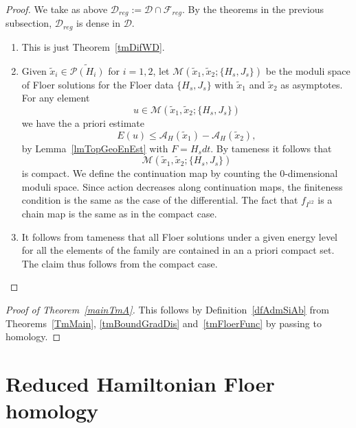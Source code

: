 \documentclass[11pt]{amsart}
\newcommand{\K}{\mathbb{K}}
\theoremstyle{definition}
\theoremstyle{remark}
\begin{document}
\begin{proof}
We take as above $\mathcal{D}_{reg}:=\mathcal{D}\cap\mathcal{F}_{reg}$. By the theorems in the previous subsection, $\mathcal{D}_{reg}$ is dense in $\mathcal{D}$.
\begin{enumerate}
\item This is just Theorem~\ref{tmDifWD}.
\item
Given $\tilde{x}_i\in\widetilde{\mathcal{P}(H_i)}$ for $i=1,2$, let $\mathcal{M}(\tilde{x}_1,\tilde{x}_2;\{H_s,J_s\})$ be the moduli space of Floer solutions for the Floer data $\{H_s,J_s\}$ with $\tilde{x}_1$ and $\tilde{x}_2$ as asymptotes. For any element
\[
u\in\mathcal{M}(\tilde{x}_1,\tilde{x}_2;\{H_s,J_s\})
\]
 we have the a priori estimate
\[
E(u)\leq \mathcal{A}_H(\tilde{x}_1)-\mathcal{A}_H(\tilde{x}_2),
\]
by Lemma~\ref{lmTopGeoEnEst} with $F=H_sdt$. By tameness it follows that
\[
\mathcal{M}(\tilde{x}_1,\tilde{x}_2;\{H_s,J_s\})
\]
is compact. We define the continuation map by counting the $0$-dimensional moduli space. Since action decreases along continuation maps, the finiteness condition is the same as the case of the differential. The fact that $f_{I^{12}}$ is a chain map is the same as in the compact case.
\item It follows from tameness that all Floer solutions under a given energy level for all the elements of the family are contained in an a priori compact set.  The claim thus follows from the compact case.

\end{enumerate}

\end{proof}


\begin{proof}[Proof of Theorem~\ref{mainTmA}]
This follows by Definition~\ref{dfAdmSiAb} from  Theorems~\ref{TmMain}, \ref{tmBoundGradDis} and~\ref{tmFloerFunc} by passing to homology.
\end{proof}

\section{Reduced Hamiltonian Floer homology}\label{SecHamFloer}
\end{document}
